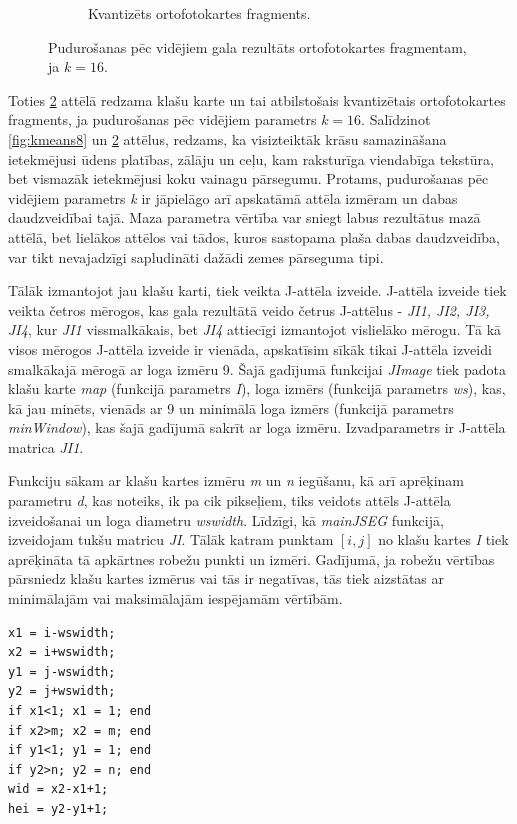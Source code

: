 \documentclass[12pt,paper=a4]{report}
\begin{document}
\begin{figure}[h!]
\begin{subfigure}[b]{.4\linewidth}
\caption{Kvantizēts ortofotokartes fragments.}
\label{kmeans16imgq}
\end{subfigure}
\caption{Pudurošanas pēc vidējiem gala rezultāts ortofotokartes fragmentam, ja $k=16$.}
\label{fig:kmeans16}
\end{figure}
Toties \ref{fig:kmeans16} attēlā redzama klašu karte un tai atbilstošais kvantizētais ortofotokartes fragments, ja pudurošanas pēc vidējiem parametrs $k=16$. Salīdzinot \ref{fig:kmeans8} un \ref{fig:kmeans16} attēlus, redzams, ka visizteiktāk krāsu samazināšana ietekmējusi ūdens platības, zālāju un ceļu, kam raksturīga viendabīga tekstūra, bet vismazāk ietekmējusi koku vainagu pārsegumu. Protams, pudurošanas pēc vidējiem parametrs \textit{k} ir jāpielāgo arī apskatāmā attēla izmēram un dabas daudzveidībai tajā. Maza parametra vērtība var sniegt labus rezultātus mazā attēlā, bet lielākos attēlos vai tādos, kuros sastopama plaša dabas daudzveidība, var tikt nevajadzīgi sapludināti dažādi zemes pārseguma tipi.\par
Tālāk izmantojot jau klašu karti, tiek veikta J-attēla izveide. J-attēla izveide tiek veikta četros mērogos, kas gala rezultātā veido četrus J-attēlus - \textit{JI1, JI2, JI3, JI4}, kur \textit{JI1} vissmalkākais, bet \textit{JI4} attiecīgi izmantojot vislielāko mērogu. Tā kā visos mērogos J-attēla izveide ir vienāda, apskatīsim sīkāk tikai J-attēla izveidi smalkākajā mērogā ar loga izmēru 9. Šajā gadījumā funkcijai \textit{JImage} tiek padota klašu karte \textit{map} (funkcijā parametrs \textit{I}), loga izmērs (funkcijā parametrs \textit{ws}), kas, kā jau minēts, vienāds ar 9 un minimālā loga izmērs (funkcijā parametrs \textit{minWindow}), kas šajā gadījumā sakrīt ar loga izmēru. Izvadparametrs ir J-attēla matrica \textit{JI1}. \par
Funkciju sākam ar klašu kartes izmēru \textit{m} un \textit{n} iegūšanu, kā arī aprēķinam parametru \textit{d}, kas noteiks, ik pa cik pikseļiem, tiks veidots attēls J-attēla izveidošanai un loga diametru \textit{wswidth}. Līdzīgi, kā \textit{mainJSEG} funkcijā, izveidojam tukšu matricu \textit{JI}. Tālāk katram punktam $[i,j]$ no klašu kartes \textit{I} tiek aprēķināta tā apkārtnes robežu punkti un izmēri. Gadījumā, ja robežu vērtības pārsniedz klašu kartes izmērus vai tās ir negatīvas, tās tiek aizstātas ar minimālajām vai maksimālajām iespējamām vērtībām. 
\begin{lstlisting}
x1 = i-wswidth;
x2 = i+wswidth;
y1 = j-wswidth;
y2 = j+wswidth;
if x1<1; x1 = 1; end
if x2>m; x2 = m; end
if y1<1; y1 = 1; end
if y2>n; y2 = n; end
wid = x2-x1+1;
hei = y2-y1+1;
\end{lstlisting}
\end{document}

